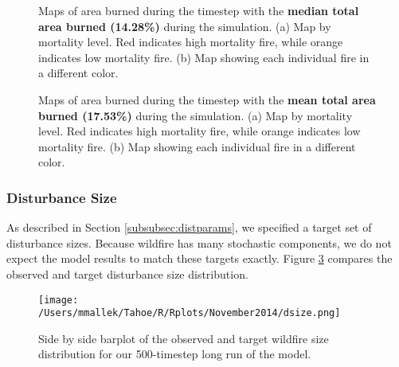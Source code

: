 \begin{figure}[!htbp]
  \centering
  \caption{Maps of area burned during the timestep with the \textbf{median total area burned (14.28\%)} during the simulation. (a) Map by mortality level. Red indicates high mortality fire, while orange indicates low mortality fire. (b) Map showing each individual fire in a different color.}
  \label{fig:darea_median_map}
\end{figure}

\begin{figure}[!htbp]
  \centering
  \caption{Maps of area burned during the timestep with the \textbf{mean total area burned (17.53\%)} during the simulation. (a) Map by mortality level. Red indicates high mortality fire, while orange indicates low mortality fire. (b) Map showing each individual fire in a different color.}
  \label{fig:darea_mean_map}
\end{figure}

\subsubsection{Disturbance Size} 
As described in Section \ref{subsubsec:distparams}, we specified a target set of disturbance sizes. Because wildfire has many stochastic components, we do not expect the model results to match these targets exactly. Figure \ref{fig:dsize} compares the observed and target disturbance size distribution.



\begin{figure}[!htbp]
\centering
\texttt{[image: /Users/mmallek/Tahoe/R/Rplots/November2014/dsize.png]}
\caption{Side by side barplot of the observed and target wildfire size distribution for our 500-timestep long run of the model.}
\label{fig:dsize}
\end{figure}




